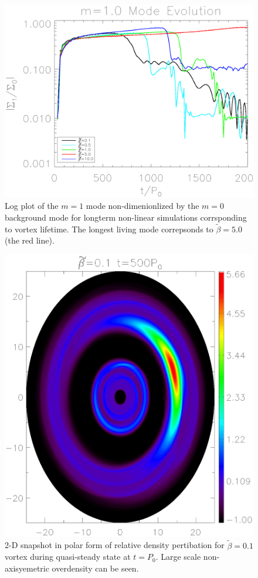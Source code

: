 \begin{figure}
  \includegraphics[width=\linewidth,clip=true,trim=0.5cm
    0cm 0cm 1cm]{figures/longterm_stability}
  \caption{Log plot of the $m=1$ mode non-dimenionlized by the $m=0$ background mode for longterm non-linear simulations corrsponding to vortex lifetime. The longest living mode correpsonds to $\tilde\beta=5.0$ (the red line). \label{lifetimeplot}}
\end{figure}

\begin{figure}
  \includegraphics[width=\linewidth,height=\linewidth]{figures/vortex2D}
  \caption{2-D snapshot in polar form of relative density pertibation for $\tilde\beta=0.1$ vortex during quasi-steady state at $t=P_0$. Large scale non-axisyemetric overdensity can be seen. \label{Vortex2D}}
\end{figure}

